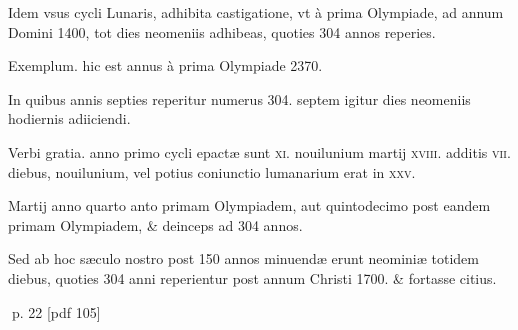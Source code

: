\begin{parnumbers}
Idem vsus cycli Lunaris, adhibita castigatione, vt à prima Olympiade, ad annum Domini 1400, tot dies neomeniis adhibeas, quoties 304 annos reperies.

Exemplum. hic est annus à prima Olympiade 2370.

In quibus annis septies reperitur  numerus 304. septem igitur dies neomeniis hodiernis adiiciendi.

Verbi gratia. anno primo cycli epactæ sunt \textsc{xi}. nouilunium martij \textsc{xviii}. additis \textsc{vii}. diebus, nouilunium, vel potius coniunctio lumanarium erat in \textsc{xxv}.

Martij anno quarto anto primam Olympiadem, aut quintodecimo post eandem primam Olympiadem, \& deinceps ad 304 annos.

Sed ab hoc sæculo nostro post 150 annos minuendæ erunt neominiæ totidem diebus, quoties 304 anni reperientur post annum Christi 1700. \& fortasse citius.

\end{parnumbers}
\clearpage
p. 22 [pdf 105]

